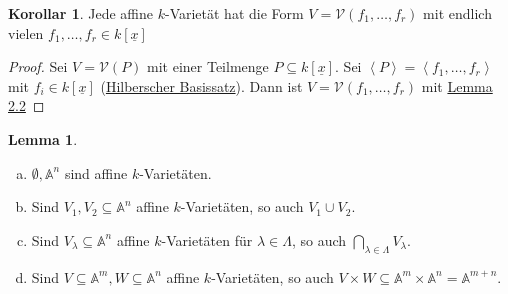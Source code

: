 \documentclass[
twoside=semi,
fontsize=12,
DIV=12, 
cleardoublepage=current,
leqno,
headings=optiontoheadandtoc, 
toc=idx
]{scrbook}
\newcommand{\A}{\mathbb{A}}
\newcommand{\V}{\mathcal{V}}
\newcommand{\x}{\underline{x}}
\newcommand{\bracC}[1]{\left< #1 \right>}
\theoremstyle{definition}
\newtheorem{lemma}[definition]{Lemma}
\newtheorem{korollar}[definition]{Korollar}
\begin{document}
	\begin{korollar}\label{1.2.3}\hfill\newline
		Jede affine $k$-Variet\"at hat die Form $V=\V(f_1, \dots, f_r)$ mit endlich 
		vielen $f_1, \dots, f_r \in k[\x]$
	\end{korollar}

	\begin{proof}\hfill\newline
		Sei $V = \V(P)$ mit einer Teilmenge $P \subseteq k[\x]$. Sei $\bracC{P} = \bracC{f_1, \dots, f_r}$ mit $f_i \in k[\x]$ (\hyperref[1.1.13]{Hilberscher Basissatz}). Dann ist $V = \V(f_1, \dots, f_r)$ mit \hyperref[1.2.2]{Lemma 2.2}
	\end{proof}

	\begin{lemma}\label{1.2.4}\hfill
		\begin{enumerate}[(a)]
			\item $\emptyset, \A^n$ sind affine $k$-Variet\"aten.
			
			\item Sind $V_1, V_2 \subseteq \A^n$ affine $k$-Variet\"aten, so auch $V_1 \cup V_2$.
			
			\item Sind $V_\lambda \subseteq \A^n$ affine $k$-Variet\"aten f\"ur $\lambda \in \Lambda$, so auch $\displaystyle \bigcap_{\lambda \in \Lambda} V_\lambda$.
			
			\item Sind $V \subseteq \A^m, W \subseteq \A^n$ affine $k$-Variet\"aten, so auch $V\times W \subseteq \A^m \times \A^n = \A^{m+n}$.
		\end{enumerate}
	\end{lemma}
\end{document}
